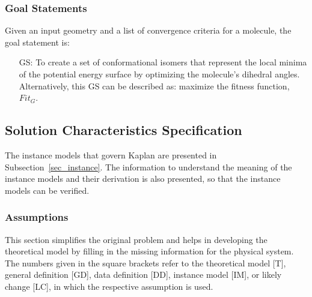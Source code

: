 \documentclass[12pt]{article}
\newcounter{goalnum} %
\newcommand{\progname}{Kaplan} %
\begin{document}
\subsubsection{Goal Statements}

\noindent Given an input geometry and a list of convergence criteria for a 
molecule, the goal statement is:

\begin{itemize}

\item[GS\refstepcounter{goalnum}\thegoalnum \label{goal}:] To 
create a set of conformational isomers that represent the local minima of the 
potential energy surface by optimizing the molecule's 
dihedral angles. 
Alternatively, this GS can be described as: maximize the fitness function, 
$Fit_G$.


\end{itemize}

\subsection{Solution Characteristics Specification}

The instance models that govern \progname{} are presented in
Subsection~\ref{sec_instance}.  The information to understand the meaning of the
instance models and their derivation is also presented, so that the instance
models can be verified.

\subsubsection{Assumptions}

This section simplifies the original problem and helps in developing the
theoretical model by filling in the missing information for the physical
system. The numbers given in the square brackets refer to the theoretical model
[T], general definition [GD], data definition [DD], instance model [IM], or
likely change [LC], in which the respective assumption is used.
\end{document}
